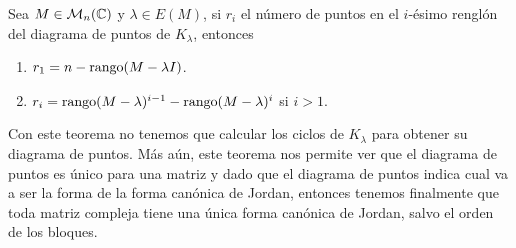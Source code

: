 \begin{teor}
  Sea $M \in \mathcal{M}_n(\mathbb{C})$ y $\lambda \in E(M)$, si $r_i$ el número de puntos en el $i$-ésimo renglón del diagrama de puntos de $K_\lambda$, entonces
  \begin{enumerate}
    \item $r_1 = n - \operatorname{rango}(M-\lambda I)$.
    \item $r_i = \operatorname{rango}(M-\lambda)^{i-1} - \operatorname{rango}(M-\lambda)^i$ si $i>1$.
  \end{enumerate}
\end{teor}

Con este teorema no tenemos que calcular los ciclos de $K_\lambda$ para obtener su diagrama de puntos. Más aún, este teorema nos permite ver que el diagrama de puntos es único para una matriz y dado que el diagrama de puntos indica cual va a ser la forma de la forma canónica de Jordan, entonces tenemos finalmente que toda matriz compleja tiene una única forma canónica de Jordan, salvo el orden de los bloques.

